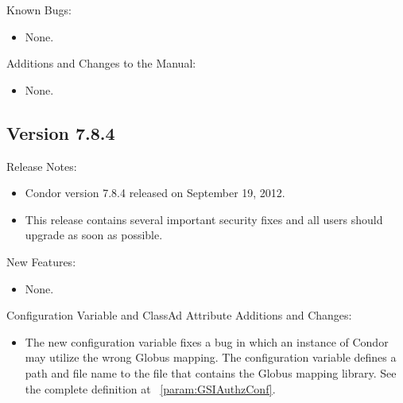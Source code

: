 \noindent Known Bugs:

\begin{itemize}

\item None.

\end{itemize}

\noindent Additions and Changes to the Manual:

\begin{itemize}

\item None.

\end{itemize}


\subsection*{\label{sec:New-7-8-4}Version 7.8.4}

\noindent Release Notes:

\begin{itemize}

\item Condor version 7.8.4 released on September 19, 2012.

\item This release contains several important security fixes and all users should upgrade as soon as possible.

\end{itemize}


\noindent New Features:

\begin{itemize}

\item None.

\end{itemize}

\noindent Configuration Variable and ClassAd Attribute Additions and Changes:

\begin{itemize}

\item The new configuration variable 
fixes a bug in which an instance of Condor may utilize the  
wrong Globus mapping.
The configuration variable defines a path and file name 
to the file that contains the Globus mapping library. 
See the complete definition at
~\ref{param:GSIAuthzConf}.


\end{itemize}

